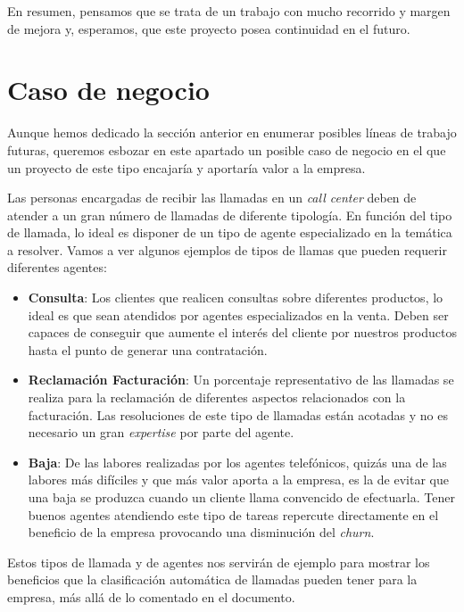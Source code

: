 En resumen, pensamos que se trata de un trabajo con mucho recorrido y margen de mejora y, esperamos, que este proyecto posea continuidad en el futuro.

\section{Caso de negocio}
\label{section:con:neg}

Aunque hemos dedicado la sección anterior en enumerar posibles líneas de trabajo futuras, queremos esbozar en  este apartado un posible caso de negocio en el que un proyecto de este tipo encajaría y aportaría valor a la empresa. 

Las personas encargadas de recibir las llamadas en un \textit{call center} deben de atender a un gran número de llamadas de diferente tipología. En función del tipo de llamada, lo ideal es disponer de un tipo de agente especializado en la temática a resolver. Vamos a ver algunos ejemplos de tipos de llamas que pueden requerir diferentes agentes:

\begin{itemize}
\item \textbf{Consulta}:  Los clientes que realicen consultas sobre diferentes productos, lo ideal es que sean atendidos por agentes especializados en la venta. Deben ser capaces de conseguir que aumente el interés del cliente por nuestros productos hasta el punto de generar una contratación. 

\item \textbf{Reclamación Facturación}: Un porcentaje representativo de las llamadas se realiza para la reclamación de diferentes aspectos relacionados con la facturación. Las resoluciones de este tipo de llamadas están acotadas y  no es necesario un gran \textit{expertise} por parte del agente. 

\item \textbf{Baja}: De las labores realizadas por los agentes telefónicos, quizás una de las labores más difíciles y que más valor aporta a la empresa, es la de evitar que una baja se produzca cuando un cliente llama convencido de efectuarla. Tener buenos agentes atendiendo este tipo de tareas repercute directamente en el beneficio de la empresa provocando una disminución del \textit{churn}.
\end{itemize}



Estos tipos de llamada y de agentes nos servirán de ejemplo para mostrar los beneficios que la clasificación automática de llamadas pueden tener para la empresa, más allá de lo comentado en el documento.

